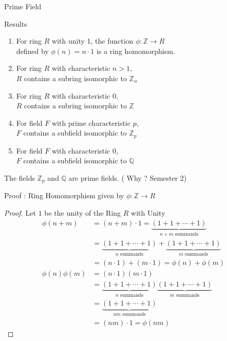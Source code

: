 \documentclass{beamer}
\begin{document}
\begin{frame}{Prime Field}
\begin{block}{Results}
\begin{enumerate}
	\item For ring $R$ with unity 1, the function $\phi : \mathbb{Z} \to R$\\
		\hspace{1em} defined by $\phi(n) = n \cdot 1$ is a ring homomorphism.
	\item For ring $R$ with characteristic $n > 1$,\\
		\hspace{5em} $R$ contains a subring isomorphic to  $\mathbb{Z}_n$
	\item For ring $R$ with characteristic $0$,\\
		\hspace{5em} $R$ contains a subring isomorphic to $\mathbb{Z}$
	\item For field $F$ with prime characteristic $p$,\\
		\hspace{5em} $F$ contains a subfield isomorphic to  $\mathbb{Z}_p$
	\item For field $F$ with characteristic $0$,\\
		\hspace{5em} $F$ contains a subfield isomorphic to $\mathbb{Q}$
\end{enumerate}
\end{block}
\begin{definition}
	The fields $\mathbb{Z}_p$ and $\mathbb{Q}$ are prime fields. ({\color{blue} Why ?} Semester 2)
\end{definition}
\end{frame}

\begin{frame}{Proof : Ring Homomorphism given by $\phi : \mathbb{Z} \to R$}
\begin{proof}
	Let $1$ be the unity of the Ring $R$ with Unity
	\begin{align*}
		\phi(n+m) & = (n+m) \cdot 1 
		 = \underbrace{(1+1+\cdots+1)}_{\text{$n+m$ summands}} \\
		& = \underbrace{(1+1+\cdots+1)}_{\text{$n$ summands}} + \underbrace{(1+1+\cdots+1)}_{\text{$m$ summands}} \\
		& = (n \cdot 1)+(m \cdot 1) = \phi(n) + \phi(m)\\ \hline
		\phi(n)\phi(m) & = (n \cdot 1)(m \cdot 1) \\
		& = \underbrace{(1+1+\cdots+1)}_{\text{$n$ summands}} \underbrace{(1+1+\cdots+1)}_{\text{$m$ summands}} \\
		& = \underbrace{(1+1+\cdots+1)}_{\text{$nm$ summands}} \\
		& = (nm) \cdot 1 = \phi(nm)
	\end{align*}
\end{proof}
\end{frame}
\end{document}

